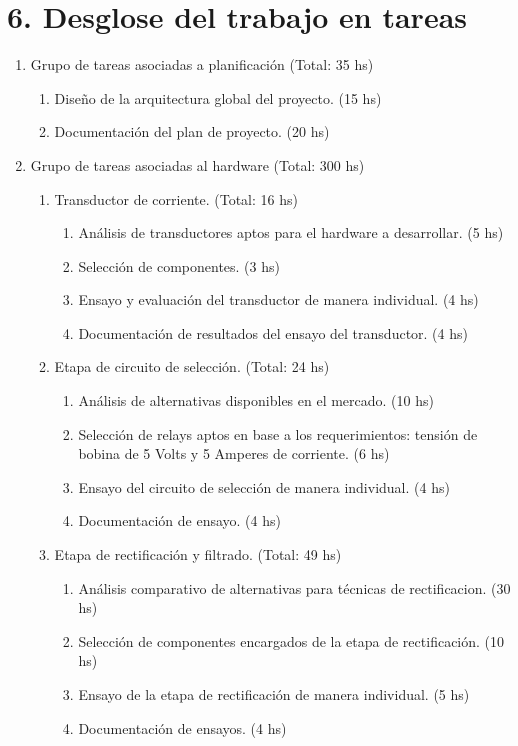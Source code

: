 \documentclass[11pt]{charter}
\begin{document}

\section{6. Desglose del trabajo en tareas}
\label{sec:wbs}
\begin{enumerate}
\item Grupo de tareas asociadas a planificación (Total: 35 hs)
	\begin{enumerate}
		\item Diseño de la arquitectura global del proyecto. (15 hs)
		\item Documentación del plan de proyecto. (20 hs)
	\end{enumerate}
\item Grupo de tareas asociadas al hardware (Total: 300 hs)
	\begin{enumerate}
		 \item Transductor de corriente. (Total: 16 hs)
			 \begin{enumerate}[label*=\arabic*.]
			 	\item Análisis de transductores aptos para el hardware a desarrollar. (5 hs)
			 	\item Selección de componentes. (3 hs)
			 	\item Ensayo y evaluación del transductor de manera individual. (4 hs)
			 	\item Documentación de resultados del ensayo del transductor. (4 hs)
			 \end{enumerate}
			
		 \item Etapa de circuito de selección. (Total: 24 hs)
			 \begin{enumerate}[label*=\arabic*.]
			 	\item Análisis de alternativas disponibles en el mercado. (10 hs)
			 	\item Selección de relays aptos en base a los requerimientos: tensión de bobina de 5 Volts y 5 Amperes de corriente. (6 hs)
			 	\item Ensayo del circuito de selección de manera individual. (4 hs)
			 	\item Documentación de ensayo. (4 hs)
			 \end{enumerate}			
			
		 \item Etapa de rectificación y filtrado. (Total: 49 hs)
			 \begin{enumerate}[label*=\arabic*.]
				\item Análisis comparativo de alternativas para técnicas de rectificacion. (30 hs)
				\item Selección de componentes encargados de la etapa de rectificación. (10 hs)
				\item Ensayo de la etapa de rectificación de manera individual. (5 hs)
				\item Documentación de ensayos. (4 hs)
			 \end{enumerate}
			

\end{enumerate}
\end{enumerate}
\end{document}

